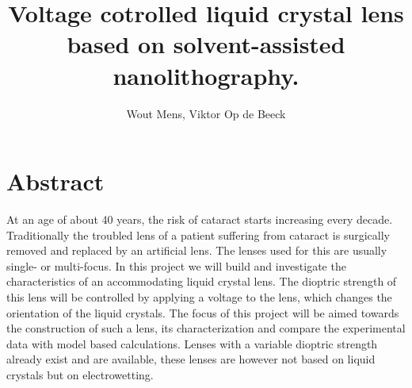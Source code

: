 \documentclass[a4paper]{article}
\title{Voltage cotrolled liquid crystal lens based on solvent-assisted nanolithography.}
\author{Wout Mens, Viktor Op de Beeck}
\begin{document}
\maketitle
\section{Abstract}
At an age of about 40 years, the risk of cataract starts increasing every decade. Traditionally the troubled lens of a patient suffering from cataract is surgically removed and replaced by an artificial lens. The lenses used for this are usually single- or multi-focus. In this project we will build and investigate the characteristics of an accommodating liquid crystal lens. The dioptric strength of this lens will be controlled by applying a voltage to the lens, which changes the orientation of the liquid crystals. The focus of this project will be aimed towards the construction of such a lens, its characterization and compare the experimental data with model based calculations. Lenses with a variable dioptric strength already exist and are available, these lenses are however not based on liquid crystals but on electrowetting.
\end{document}
